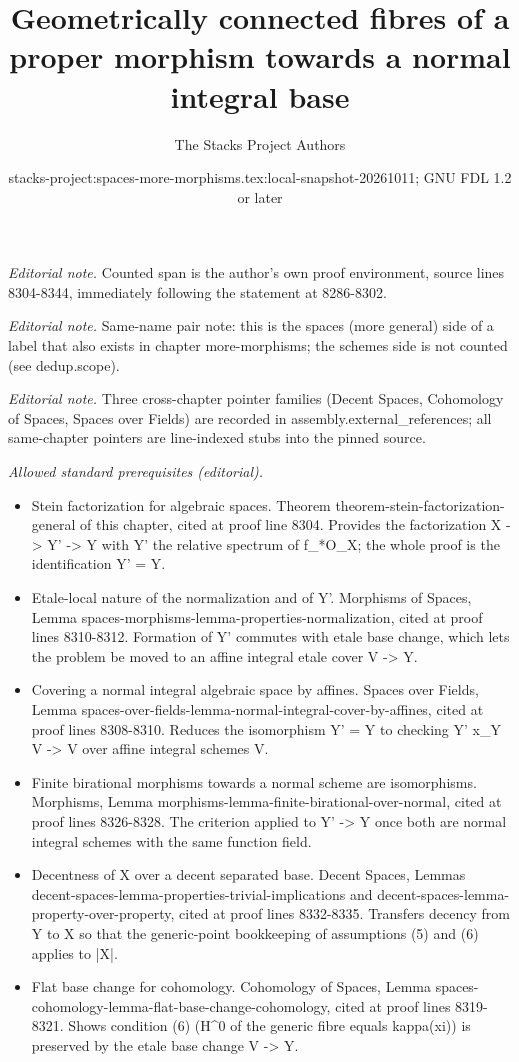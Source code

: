 \documentclass[10pt,a4paper]{amsart}
\title{Geometrically connected fibres of a proper morphism towards a normal integral base}
\author{The Stacks Project Authors}
\date{stacks-project:spaces-more-morphisms.tex:local-snapshot-20261011; GNU FDL 1.2 or later}
\theoremstyle{plain}
\theoremstyle{definition}
\theoremstyle{remark}
\numberwithin{equation}{subsection}
\begin{document}
\maketitle
\noindent\textit{Editorial note.} Counted span is the author's own proof environment, source lines 8304-8344, immediately following the statement at 8286-8302.\par\medskip
\noindent\textit{Editorial note.} Same-name pair note: this is the spaces (more general) side of a label that also exists in chapter more-morphisms; the schemes side is not counted (see dedup.scope).\par\medskip
\noindent\textit{Editorial note.} Three cross-chapter pointer families (Decent Spaces, Cohomology of Spaces, Spaces over Fields) are recorded in assembly.external\_references; all same-chapter pointers are line-indexed stubs into the pinned source.\par\medskip
\noindent\textit{Allowed standard prerequisites (editorial).}\begin{itemize}
\item Stein factorization for algebraic spaces. Theorem theorem-stein-factorization-general of this chapter, cited at proof line 8304. Provides the factorization X -> Y' -> Y with Y' the relative spectrum of f\_*O\_X; the whole proof is the identification Y' = Y.
\item Etale-local nature of the normalization and of Y'. Morphisms of Spaces, Lemma spaces-morphisms-lemma-properties-normalization, cited at proof lines 8310-8312. Formation of Y' commutes with etale base change, which lets the problem be moved to an affine integral etale cover V -> Y.
\item Covering a normal integral algebraic space by affines. Spaces over Fields, Lemma spaces-over-fields-lemma-normal-integral-cover-by-affines, cited at proof lines 8308-8310. Reduces the isomorphism Y' = Y to checking Y' x\_Y V -> V over affine integral schemes V.
\item Finite birational morphisms towards a normal scheme are isomorphisms. Morphisms, Lemma morphisms-lemma-finite-birational-over-normal, cited at proof lines 8326-8328. The criterion applied to Y' -> Y once both are normal integral schemes with the same function field.
\item Decentness of X over a decent separated base. Decent Spaces, Lemmas decent-spaces-lemma-properties-trivial-implications and decent-spaces-lemma-property-over-property, cited at proof lines 8332-8335. Transfers decency from Y to X so that the generic-point bookkeeping of assumptions (5) and (6) applies to |X|.
\item Flat base change for cohomology. Cohomology of Spaces, Lemma spaces-cohomology-lemma-flat-base-change-cohomology, cited at proof lines 8319-8321. Shows condition (6) (H\textasciicircum{}0 of the generic fibre equals kappa(xi)) is preserved by the etale base change V -> Y.
\end{itemize}\medskip
\end{document}
